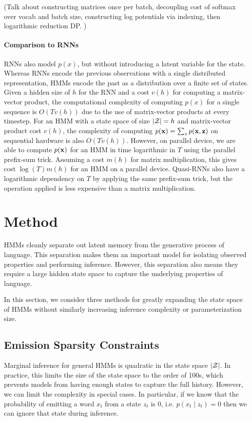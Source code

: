 \documentclass[11pt,a4paper]{article}
\begin{document}
(Talk about constructing matrices once per batch,
decoupling cost of softmax over vocab and batch size,
constructing log potentials via indexing,
then logarithmic reduction DP. )

\paragraph{Comparison to RNNs}
RNNs also model $p(x)$, but without introducing a latent variable for the state.
Whereas RNNs encode the previous observations with a single distributed representation,
HMMs encode the past as a distribution over a finite set of states.
Given a hidden size of $h$ for the RNN and a cost $v(h)$ for computing
a matrix-vector product, the computational complexity of
computing $p(x)$ for a single sequence is $O(Tv(h))$ due to the use
of matrix-vector products at every timestep.
For an HMM with a state space of size $|\mathcal{Z}| = h$ and matrix-vector product cost $v(h)$,
the complexity of computing $p(\mathbf{x}) = \sum_z p(\mathbf{x},\mathbf{z})$ on sequential
hardware is also $O(Tv(h))$.
However, on parallel device, we are able to compute $p(\mathbf{x})$
for an HMM in time logarithmic in $T$ using the parallel prefix-sum trick. 
Assuming a cost $m(h)$ for matrix multiplication, this gives cost
$\log(T)m(h)$ for an HMM on a parallel device.
Quasi-RNNs \citep{bradbury2016qrnn} also have a logarithmic dependency on $T$
by applying the same prefix-sum trick, but the operation applied is 
less expensive than a matrix multiplication.

\section{Method}

HMMs cleanly separate out latent memory from the generative process of language.
This separation makes them an important model for isolating observed properties and performing inference.
However, this separation also means they require a large hidden state space to
capture the underlying properties of language. 

In this section, we consider three methods for greatly expanding the state space of HMMs
without similarly increasing inference complexity or parameterization size. 

\subsection{Emission Sparsity Constraints}
Marginal inference for general HMMs is quadratic in the  state space $|\mathcal{Z}|$.
In practice, this limits the size of the state space to the order of 100s,
which prevents models from having enough states to capture the full history.
However, we can limit the complexity in special cases.
In particular, if we know that the probability of emitting a word $x_t$ from a state $z_t$ is 0,
i.e. $p(x_t \mid z_t) = 0$  then we can ignore that state during inference. 
\end{document}

